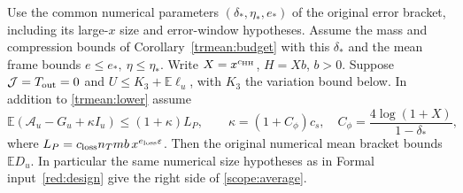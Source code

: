\begin{corollary}\label{trmean:loss}
Use the common numerical parameters \((\delta_*,\eta_*,e_*)\) of
the original error bracket, including its large-\(x\) size and
error-window hypotheses. Assume the mass and compression bounds of
Corollary~\ref{trmean:budget} with this \(\delta_*\) and the mean
frame bounds \(e\le e_*,\ \eta\le\eta_*\). Write \(X=x^{c_{\rm HH}}\),
\(H=Xb\), \(b>0\). Suppose \(\mathcal J=T_{\rm out}=0\) and
\(U\le K_3+\mathbb E\ell_u\), with \(K_3\) the variation bound below.
In addition to \eqref{trmean:lower} assume
\begin{equation}\label{trmean:signed}
 \mathbb E(\mathcal A_u-G_u+\kappa I_u)\le(1+\kappa)L_P,\qquad
 \kappa=(1+C_\phi)c_s,\quad
 C_\phi=\frac{4\log(1+X)}{1-\delta_*},
\end{equation}
where \(L_P=c_{\rm loss}n_Tmb\,x^{e_{\rm loss}\varepsilon}\).
Then the original numerical mean bracket bounds \(\mathbb E D_u\).
In particular the same numerical size hypotheses as in Formal
input~\ref{red:design} give the right side of \eqref{scope:average}.
\end{corollary}
